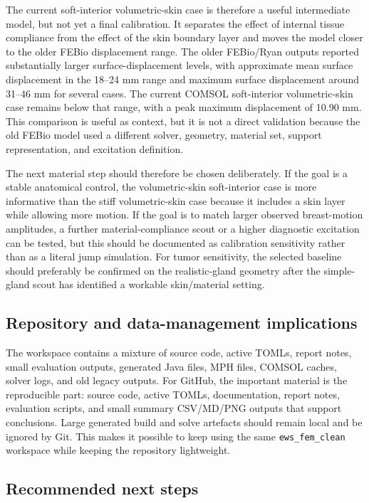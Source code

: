 The current soft-interior volumetric-skin case is therefore a useful intermediate model, but not yet a final calibration. It separates the effect of internal tissue compliance from the effect of the skin boundary layer and moves the model closer to the older FEBio displacement range. The older FEBio/Ryan outputs reported substantially larger surface-displacement levels, with approximate mean surface displacement in the 18--24 mm range and maximum surface displacement around 31--46 mm for several cases. The current COMSOL soft-interior volumetric-skin case remains below that range, with a peak maximum displacement of 10.90 mm. This comparison is useful as context, but it is not a direct validation because the old FEBio model used a different solver, geometry, material set, support representation, and excitation definition.

The next material step should therefore be chosen deliberately. If the goal is a stable anatomical control, the volumetric-skin soft-interior case is more informative than the stiff volumetric-skin case because it includes a skin layer while allowing more motion. If the goal is to match larger observed breast-motion amplitudes, a further material-compliance scout or a higher diagnostic excitation can be tested, but this should be documented as calibration sensitivity rather than as a literal jump simulation. For tumor sensitivity, the selected baseline should preferably be confirmed on the realistic-gland geometry after the simple-gland scout has identified a workable skin/material setting.

\subsection{Repository and data-management implications}

The workspace contains a mixture of source code, active TOMLs, report notes, small evaluation outputs, generated Java files, MPH files, COMSOL caches, solver logs, and old legacy outputs. For GitHub, the important material is the reproducible part: source code, active TOMLs, documentation, report notes, evaluation scripts, and small summary CSV/MD/PNG outputs that support conclusions. Large generated build and solve artefacts should remain local and be ignored by Git. This makes it possible to keep using the same \texttt{ews\_fem\_clean} workspace while keeping the repository lightweight.

\subsection{Recommended next steps}

